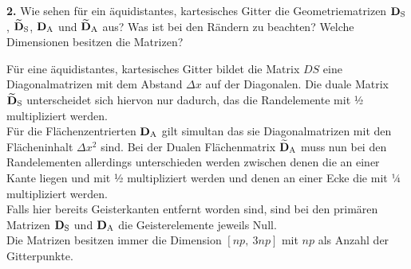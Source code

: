 \documentclass[Protokollheft.tex]{subfiles}
\begin{document}
\begin{framed}
	\noindent \textbf{2.} Wie sehen für ein äquidistantes, kartesisches Gitter die Geometriematrizen $\mathbf{D}_\text{S}$, $\mathbf{\widetilde{D}}_\text{S}$, $\mathbf{D}_\text{A}$ und $\mathbf{\widetilde{D}}_\text{A}$ aus? Was ist bei den Rändern zu beachten? Welche Dimensionen besitzen die Matrizen?\label{exer:geoMatsStructure}
\end{framed}
\noindent
Für eine äquidistantes, kartesisches Gitter bildet die Matrix $DS$ eine Diagonalmatrizen mit dem Abstand $\Delta x$ auf der Diagonalen. Die duale Matrix $\mathbf{\widetilde{D}}_\text{S}$ unterscheidet sich hiervon nur dadurch, das die Randelemente mit ½ multipliziert werden. \\
Für die Flächenzentrierten $\mathbf{D}_\text{A}$ gilt simultan das sie Diagonalmatrizen mit den Flächeninhalt $\Delta x^2$ sind. Bei der Dualen Flächenmatrix $\mathbf{\widetilde{D}}_\text{A}$ muss nun bei den Randelementen allerdings unterschieden werden zwischen denen die an einer Kante liegen und mit ½ multipliziert werden und denen an einer Ecke die mit ¼ multipliziert werden. \\
Falls hier bereits Geisterkanten entfernt worden sind, sind bei den primären Matrizen $\mathbf{D}_\text{S}$ und $\mathbf{D}_\text{A}$ die Geisterelemente jeweils Null. \\
\noindent
Die Matrizen besitzen immer die Dimension  $[np,\ 3np]$ mit $np$ als Anzahl der Gitterpunkte.
\end{document}
